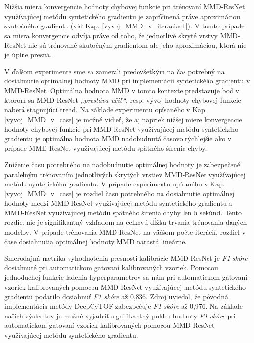 Nižšia miera konvergencie hodnoty chybovej funkcie pri trénovaní MMD-ResNet využívajúcej metódu syntetického gradientu je zapríčinená práve aproximáciou skutočného gradientu (viď Kap. \ref{vyvoj_MMD_v_iteraciach}). V tomto prípade sa miera konvergencie odvíja práve od toho, že jednotlivé skryté vrstvy MMD-ResNet nie sú trénované skutočným gradientom ale jeho aproximáciou, ktorá nie je úplne presná. 

V ďalšom experimente sme sa zamerali predovšetkým na čas potrebný na dosiahnutie optimálnej hodnoty MMD pri implementácii syntetického gradientu v MMD-ResNet. Optimálna hodnota MMD v tomto kontexte predstavuje bod v ktorom sa MMD-ResNet \textit{„prestáva učiť“}, resp. vývoj hodnoty chybovej funkcie naberá stagnujúci trend. Na základe experimentu opísaného v Kap. \ref{vyvoj_MMD_v_case} je možné vidieť, že aj napriek nižšej miere konvergencie hodnoty chybovej funkcie pri MMD-ResNet využívajúcej metódu syntetického gradientu je optimálna hodnota MMD nadobudnutá časovo rýchlejšie ako v prípade MMD-ResNet využívajúcej metódu spätného šírenia chyby.

Zníženie času potrebného na nadobudnutie optimálnej hodnoty je zabezpečené paralelným trénovaním jednotlivých skrytých vrstiev MMD-ResNet využívajúcej metódu syntetického gradientu. V prípade experimentu opísaného v Kap. \ref{vyvoj_MMD_v_case} je rozdiel času potrebného na dosiahnutie optimálnej hodnoty medzi MMD-ResNet využívajúcej metódu syntetického gradientu a MMD-ResNet využívajúcej metódu spätného šírenia chyby len 5 sekúnd. Tento rozdiel nie je signifikantný vzhľadom na celkovú dĺžku trvania trénovania daných modelov. V prípade trénovania MMD-ResNet na väčšom počte iterácií, rozdiel v čase dosiahnutia optimálnej hodnoty MMD narastá lineárne.

Smerodajná metrika vyhodnotenia presnosti kalibrácie MMD-ResNet je \textit{F1 skóre} dosiahnuté pri automatickom gatovaní kalibrovaných vzoriek. Pomocou jednoduchej funkcie ladenia hyperparametrov sa nám pri automatickom gatovaní vzoriek kalibrovaných pomocou MMD-ResNet využívajúcej metódu syntetického gradientu podarilo dosiahnuť \textit{F1 skóre} až 0,836. Zdroj \cite{Li2017} uviedol, že pôvodná implementácia metódy DeepCyTOF zabezpečuje \textit{F1 skóre} až 0,976. Na základe našich výsledkov je možné vyjadriť signifikantný pokles hodnoty \textit{F1 skóre} pri automatickom gatovaní vzoriek kalibrovaných pomocou MMD-ResNet využívajúcej metódu syntetického gradientu.

